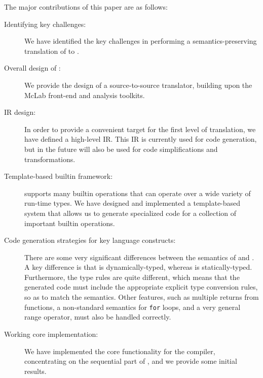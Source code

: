 The major contributions  of this paper are as follows:

\begin{description}

\item[Identifying key challenges:] We have identified the key challenges
in performing a semantics-preserving translation of \matlab to \xten.

\item[Overall design of \mixten:] We provide the design of a 
source-to-source translator, building upon the McLab front-end and
analysis toolkits.

\item[\mixten IR design:] In order to provide a convenient
target for the first level of translation, we have defined a high-level
\mixten IR.  This IR is currently used for code generation,  but in the
future will also be used for code simplifications and transformations.

\item[Template-based builtin framework:] \matlab supports many builtin
operations that can operate over a wide variety of run-time types.  We
have designed and implemented a template-based system that allows us to
generate specialized \xten code for a collection of important builtin
operations.

\item[Code generation strategies for key language constructs:]  There
are some very significant differences between the semantics of \matlab
and \xten.  A key difference is that \matlab is dynamically-typed,
whereas \xten is statically-typed.   Furthermore, the type rules are
quite different, which means that the generated \xten code must include
the appropriate explicit type conversion rules, so as to match the
\matlab semantics.   Other \matlab features, such as multiple returns
from functions, a non-standard semantics for \texttt{for} loops, and a
very general range operator, must also be handled correctly.

\item[Working core implementation:] We have implemented the core
functionality for the \mixten compiler, concentrating on the sequential
part of \xten, and we provide some initial results.

\end{description}
